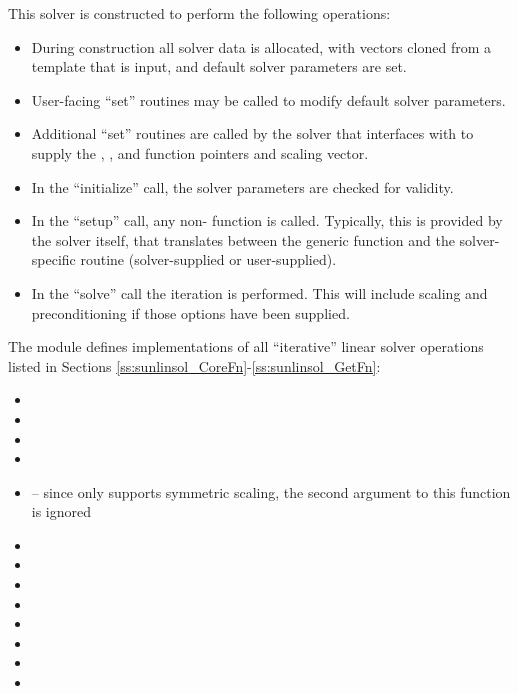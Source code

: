 This solver is constructed to perform the following operations:
\begin{itemize}
\item During construction all {\nvector} solver data is allocated,
  with vectors cloned from a template {\nvector} that is input, and
  default solver parameters are set.
\item User-facing ``set'' routines may be called to modify default
  solver parameters.
\item Additional ``set'' routines are called by the {\sundials} solver
  that interfaces with {\sunlinsolpcg} to supply the
  , , and  function pointers and
   scaling vector.
\item In the ``initialize'' call, the solver parameters are checked
  for validity.
\item In the ``setup'' call, any non-  function is
  called.  Typically, this is provided by the {\sundials} solver
  itself, that translates between the generic  function and
  the solver-specific routine (solver-supplied or user-supplied).
\item In the ``solve'' call the {\pcg} iteration is performed.  This
  will include scaling and preconditioning if those options have been
  supplied.
\end{itemize}


\noindent The {\sunlinsolpcg} module defines implementations of all
``iterative'' linear solver operations listed in Sections
\ref{ss:sunlinsol_CoreFn}-\ref{ss:sunlinsol_GetFn}:
\begin{itemize}
\item {}
\item {}
\item {}
\item {}
\item {} -- since {\pcg} only
  supports symmetric scaling, the second {\nvector} argument to this
  function is ignored
\item {}
\item {}
\item {}
\item {}
\item {}
\item {}
\item {}
\item {}
\end{itemize}
